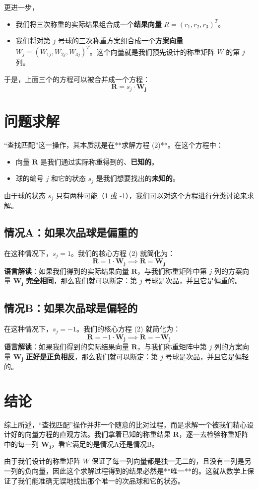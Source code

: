\documentclass[12pt, a4paper]{ctexart}
\begin{document}
更进一步，
\begin{itemize}
    \item 我们将三次称重的实际结果组合成一个\textbf{结果向量} $R = (r_1, r_2, r_3)^T$。
    \item 我们将对第 $j$ 号球的三次称重方案组合成一个\textbf{方案向量} $W_j = (W_{1j}, W_{2j}, W_{3j})^T$。这个向量就是我们预先设计的称重矩阵 $W$ 的第 $j$ 列。
\end{itemize}
于是，上面三个的方程可以被合并成一个方程：
\begin{equation}
    \mathbf{R} = s_j \cdot \mathbf{W_j}
\end{equation}

\section{问题求解}

“查找匹配”这一操作，其本质就是在**求解方程 (2)**。在这个方程中：
\begin{itemize}
    \item 向量 $\mathbf{R}$ 是我们通过实际称重得到的、\textbf{已知的}。
    \item 球的编号 $j$ 和它的状态 $s_j$ 是我们想要找出的\textbf{未知的}。
\end{itemize}
由于球的状态 $s_j$ 只有两种可能（1 或 -1），我们可以对这个方程进行分类讨论来求解。

\subsection{情况A：如果次品球是偏重的}
在这种情况下，$s_j = 1$。我们的核心方程 (2) 就简化为：
$$ \mathbf{R} = 1 \cdot \mathbf{W_j} \implies \mathbf{R} = \mathbf{W_j} $$
\textbf{语言解读}：如果我们得到的实际结果向量 $\mathbf{R}$，与我们称重矩阵中第 $j$ 列的方案向量 $\mathbf{W_j}$ \textbf{完全相同}，那么我们就可以断定：第 $j$ 号球是次品，并且它是偏重的。

\subsection{情况B：如果次品球是偏轻的}
在这种情况下，$s_j = -1$。我们的核心方程 (2) 就简化为：
$$ \mathbf{R} = -1 \cdot \mathbf{W_j} \implies \mathbf{R} = -\mathbf{W_j} $$
\textbf{语言解读}：如果我们得到的实际结果向量 $\mathbf{R}$，与我们称重矩阵中第 $j$ 列的方案向量 $\mathbf{W_j}$ \textbf{正好是正负相反}，那么我们就可以断定：第 $j$ 号球是次品，并且它是偏轻的。

\section{结论}
综上所述，“查找匹配”操作并非一个随意的比对过程，而是求解一个被我们精心设计好的向量方程的直观方法。我们拿着已知的称重结果 $\mathbf{R}$，逐一去检验称重矩阵中的每一列 $\mathbf{W_j}$，看它满足的是情况A还是情况B。

由于我们设计的称重矩阵 $W$ 保证了每一列向量都是独一无二的，且没有一列是另一列的负向量，因此这个求解过程得到的结果必然是**唯一**的。这就从数学上保证了我们能准确无误地找出那个唯一的次品球和它的状态。
\end{document}
